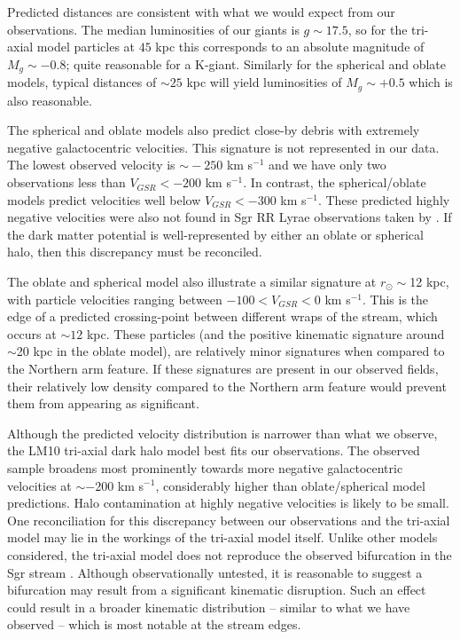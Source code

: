 	Predicted distances are consistent with what we would expect from our observations. The median luminosities of our giants is $g\sim17.5$, so for the tri-axial model particles at $45$ kpc this corresponds to an absolute magnitude of $M_g\sim-0.8$; quite reasonable for a K-giant. Similarly for the spherical and oblate models, typical distances of $\sim25$ kpc will yield luminosities of $M_g\sim+0.5$ which is also reasonable.  
	
	The spherical and oblate models also predict close-by debris with extremely negative galactocentric velocities. This signature is not represented in our data. The lowest observed velocity is $\sim{}-250$ km s$^{-1}$ and we have only two observations less than $V_{GSR} < -200$ km s$^{-1}$. In contrast, the spherical/oblate models predict velocities well below $V_{GSR} < -300$ km s$^{-1}$. These predicted highly negative  velocities were also not found in Sgr RR Lyrae observations taken by \citet{Prior;et-al_2009b}. If the dark matter potential is well-represented by either an oblate or spherical halo, then this discrepancy must be reconciled. 
	
	The oblate and spherical model also illustrate a similar signature at $r_\odot \sim$12 kpc, with particle velocities ranging between $-100 < V_{GSR} < 0$ km s$^{-1}$. This is the edge of a predicted crossing-point between different wraps of the stream, which occurs at $\sim12$ kpc. These particles (and the positive kinematic signature around $\sim$20 kpc in the oblate model), are relatively minor signatures when compared to the Northern arm feature. If these signatures are present in our observed fields, their relatively low density compared to the Northern arm feature would prevent them from appearing as significant. 
	
	Although the predicted velocity distribution is narrower than what we observe, the LM10 tri-axial dark halo model best fits our observations. The observed sample broadens most prominently towards more negative galactocentric velocities at $\sim-200$ km s$^{-1}$, considerably higher than oblate/spherical model predictions. Halo contamination at highly negative velocities is likely to be small. One reconciliation for this discrepancy between our observations and the tri-axial model may lie in the workings of the tri-axial model itself. Unlike other models considered, the tri-axial model does not reproduce the observed bifurcation in the Sgr stream \citep{Belokurov;et-al_2006}. Although observationally untested, it is reasonable to suggest a bifurcation may result from a significant kinematic disruption. Such an effect could result in a broader kinematic distribution \--- similar to what we have observed \--- which is most notable at the stream edges.
	

